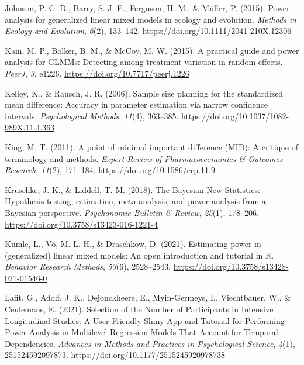 \documentclass[
  man,
  floatsintext,
  longtable,
  a4paper,
  nolmodern,
  notxfonts,
  notimes,
  colorlinks=true,linkcolor=blue,citecolor=blue,urlcolor=blue]{apa7}
\newlength{\cslhangindent}
\newenvironment{CSLReferences}[2] %
 {\begin{list}{}{%
  \setlength{\itemindent}{0pt}
  \setlength{\leftmargin}{0pt}
  \setlength{\parsep}{0pt}
  \ifodd #1
   \setlength{\leftmargin}{\cslhangindent}
   \setlength{\itemindent}{-1\cslhangindent}
  \fi
  \setlength{\itemsep}{#2\baselineskip}}}
 {\end{list}}
\begin{document}
\begin{CSLReferences}{1}{0}
Johnson, P. C. D., Barry, S. J. E., Ferguson, H. M., \& Müller, P.
(2015). Power analysis for generalized linear mixed models in ecology
and evolution. \emph{Methods in Ecology and Evolution}, \emph{6}(2),
133--142. \url{https://doi.org/10.1111/2041-210X.12306}

Kain, M. P., Bolker, B. M., \& McCoy, M. W. (2015). A practical guide
and power analysis for {GLMMs}: Detecting among treatment variation in
random effects. \emph{PeerJ}, \emph{3}, e1226.
\url{https://doi.org/10.7717/peerj.1226}

Kelley, K., \& Rausch, J. R. (2006). Sample size planning for the
standardized mean difference: {Accuracy} in parameter estimation via
narrow confidence intervals. \emph{Psychological Methods}, \emph{11}(4),
363--385. \url{https://doi.org/10.1037/1082-989X.11.4.363}

King, M. T. (2011). A point of minimal important difference ({MID}): A
critique of terminology and methods. \emph{Expert Review of
Pharmacoeconomics \& Outcomes Research}, \emph{11}(2), 171--184.
\url{https://doi.org/10.1586/erp.11.9}

Kruschke, J. K., \& Liddell, T. M. (2018). The {Bayesian New
Statistics}: {Hypothesis} testing, estimation, meta-analysis, and power
analysis from a {Bayesian} perspective. \emph{Psychonomic Bulletin \&
Review}, \emph{25}(1), 178--206.
\url{https://doi.org/10.3758/s13423-016-1221-4}

Kumle, L., Võ, M. L.-H., \& Draschkow, D. (2021). Estimating power in
(generalized) linear mixed models: {An} open introduction and tutorial
in {R}. \emph{Behavior Research Methods}, \emph{53}(6), 2528--2543.
\url{https://doi.org/10.3758/s13428-021-01546-0}

Lafit, G., Adolf, J. K., Dejonckheere, E., Myin-Germeys, I.,
Viechtbauer, W., \& Ceulemans, E. (2021). Selection of the {Number} of
{Participants} in {Intensive Longitudinal Studies}: {A User-Friendly
Shiny App} and {Tutorial} for {Performing Power Analysis} in {Multilevel
Regression Models That Account} for {Temporal Dependencies}.
\emph{Advances in Methods and Practices in Psychological Science},
\emph{4}(1), 251524592097873.
\url{https://doi.org/10.1177/2515245920978738}


\end{CSLReferences}
\end{document}
